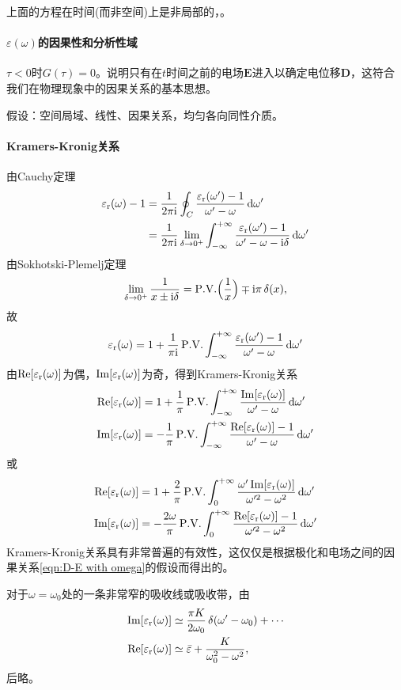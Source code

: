 上面的方程在时间(而非空间)上是非局部的，。
\paragraph{$\varepsilon(\omega)$的因果性和分析性域}
$\tau<0$时$G(\tau)=0$。说明只有在$t$时间之前的电场$\bm E$进入以确定电位移$\bm D$，这符合我们在物理现象中的因果关系的基本思想。

假设：空间局域、线性、因果关系，均匀各向同性介质。

\newcommand{\PV}{\mathop{}\!\mathrm{P.V.}}
\paragraph{Kramers-Kronig关系}
由Cauchy定理
\begin{align*}
    \varepsilon_\text r(\omega)-1&=\frac1{2\pi\mathrm{i}}\oint_C\frac{\varepsilon_\text r(\omega')-1}{\omega'-\omega}\mathop{}\!\mathrm{d}\omega'\\
    &=\frac1{2\pi\mathrm{i}}\lim_{\delta\to0^+}\int_{-\infty}^{+\infty}\frac{\varepsilon_\text r(\omega')-1}{\omega'-\omega-\mathrm{i}\delta}\mathop{}\!\mathrm{d}\omega'
\end{align*}
由Sokhotski-Plemelj定理
\[
    \lim_{\delta\to0^+}\frac1{x\pm\i\delta}=\PV\Bigkh{\frac1x}\mp\i\pi\vd(x),
\]
故
\[
    \varepsilon_\r(\omega)=1+\frac1{\pi\i}\PV\int\iti\frac{\varepsilon_\r(\omega')-1}{\omega'-\omega}\d\omega'
\]
由$\operatorname{Re}[\varepsilon_\text r(\omega)]$为偶，$\operatorname{Im}[\varepsilon_\text r(\omega)]$为奇，得到Kramers-Kronig关系
\begin{equation}
    \begin{aligned}
        \Re[\varepsilon_\r(\omega)]&=1+\frac1\pi\PV\int\iti\frac{\Im[\varepsilon_\r(\omega)]}{\omega'-\omega}\d\omega'\\
        \Im[\varepsilon_\r(\omega)]&=-\frac1\pi\mathop{}\!\mathrm{P.V.}\int\iti\frac{\Re[\varepsilon_\r(\omega)]-1}{\omega'-\omega}\d\omega'\\
    \end{aligned}
\end{equation}
或
\begin{equation}
    \begin{aligned}
        \Re[\varepsilon_\r(\omega)]&=1+\frac2\pi\PV\int\zti\frac{\omega'\Im[\varepsilon_\r(\omega)]}{\omega'^2-\omega^2}\d\omega'\\
        \Im[\varepsilon_\r(\omega)]&=-\frac{2\omega}\pi\PV\int\zti\frac{\Re[\varepsilon_\r(\omega)]-1}{\omega'^2-\omega^2}\d\omega'\\
    \end{aligned}
\end{equation}
Kramers-Kronig关系具有非常普遍的有效性，这仅仅是根据极化和电场之间的因果关系\eqref{eqn:D-E with omega}的假设而得出的。

对于$\omega=\omega_0$处的一条非常窄的吸收线或吸收带，由
\begin{align*}
    \operatorname{Im}[\varepsilon_\text r(\omega)]&\simeq\frac{\pi K}{2\omega_0}\mathop{}\!\delta(\omega'-\omega_0)+\cdots\\
    \operatorname{Re}[\varepsilon_\text r(\omega)]&\simeq\bar\varepsilon+\frac K{\omega_0^2-\omega^2},
\end{align*}
后略。

